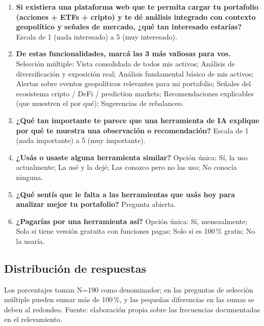 \begin{enumerate}
    \item \textbf{Si existiera una plataforma web que te permita cargar tu portafolio (acciones + ETFs + cripto) y te dé análisis integrado con contexto geopolítico y señales de mercado, ¿qué tan interesado estarías?} Escala de 1 (nada interesado) a 5 (muy interesado).
    \item \textbf{De estas funcionalidades, marcá las 3 más valiosas para vos.} Selección múltiple: Vista consolidada de todos mis activos; Análisis de diversificación y exposición real; Análisis fundamental básico de mis activos; Alertas sobre eventos geopolíticos relevantes para mi portafolio; Señales del ecosistema cripto / DeFi / prediction markets; Recomendaciones explicables (que muestren el por qué); Sugerencias de rebalanceo.
    \item \textbf{¿Qué tan importante te parece que una herramienta de IA explique por qué te muestra una observación o recomendación?} Escala de 1 (nada importante) a 5 (muy importante).
    \item \textbf{¿Usás o usaste alguna herramienta similar?} Opción única: Sí, la uso actualmente; La usé y la dejé; Las conozco pero no las uso; No conocía ninguna.
    \item \textbf{¿Qué sentís que le falta a las herramientas que usás hoy para analizar mejor tu portafolio?} Pregunta abierta.
    \item \textbf{¿Pagarías por una herramienta así?} Opción única: Sí, mensualmente; Solo si tiene versión gratuita con funciones pagas; Solo si es 100\,\% gratis; No la usaría.
\end{enumerate}

\subsection*{Distribución de respuestas}

Los porcentajes toman N=190 como denominador; en las preguntas de selección múltiple pueden sumar más de 100\,\%, y las pequeñas diferencias en las sumas se deben al redondeo. Fuente: elaboración propia sobre las frecuencias documentadas en el relevamiento.

